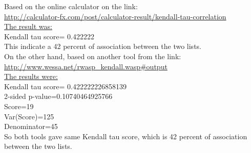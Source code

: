 \documentclass[letterpaper,11pt]{article}
\begin{document}
Based on the online calculator on the link:\\ \url{http://calculator-fx.com/post/calculator-result/kendall-tau-correlation}\\
\uline{The result was:}\\
Kendall tau score= 0.422222\\
This indicate a 42 percent of association between the two lists. \\

On the other hand, based on another tool from the link:\\
\url{http://www.wessa.net/rwasp_kendall.wasp#output}\\ \uline{The results were:}\\
Kendall tau score= 0.422222226858139\\
2-sided p-value=0.10740464925766\\
Score=19\\
Var(Score)=125\\
Denominator=45\\

So both tools gave same Kendall tau score, which is 42 percent of association between the two lists.

\pagebreak
\end{document}
